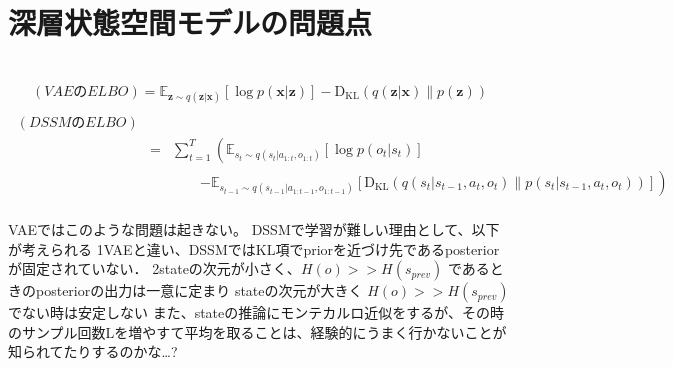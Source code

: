\section{深層状態空間モデルの問題点}
\begin{eqnarray}
  \end{eqnarray}
  
\begin{eqnarray}
    (VAEのELBO) \nonumber = \mathbb{E}_{\bm{z} \sim q(\bm{z}|\bm{x})} [\log p(\bm{x}|\bm{z})] - \mathrm{D_{KL}}(q(\bm{z}|\bm{x}) \| p(\bm{z})) \label{eq:vae_elbo2} \\
\end{eqnarray}
\begin{eqnarray}
    \ (DSSMのELBO) \nonumber \\
    &=& \sum_{t=1}^T \left( \mathbb{E}_{s_t \sim q(s_t|a_{1:t}, o_{1:t})} [\log p(o_t|s_t)] \right. \nonumber \\
    && \hspace{2em} \left. - \mathbb{E}_{s_{t-1} \sim q(s_{t-1}|a_{1:t-1}, o_{1:t-1})} [\mathrm{D_{KL}}(q(s_t|s_{t-1}, a_t, o_t) \| p(s_t|s_{t-1}, a_t, o_t))] \right)  \nonumber \\
    \label{eq:dssm_elbo2}
  \end{eqnarray}

VAEではこのような問題は起きない。
DSSMで学習が難しい理由として、以下が考えられる
1VAEと違い、DSSMではKL項でpriorを近づけ先であるposteriorが固定されていない．
2stateの次元が小さく、$H(o) >> H(s_{prev})$ であるときのposteriorの出力は一意に定まり
stateの次元が大きく $H(o) >> H(s_{prev})$でない時は安定しない
また、stateの推論にモンテカルロ近似をするが、その時のサンプル回数Lを増やすて平均を取ることは、経験的にうまく行かないことが知られてたりするのかな…?